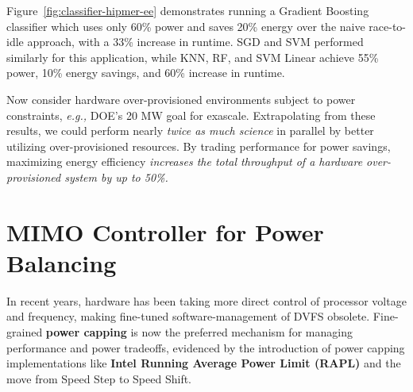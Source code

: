 \documentclass[a0,portrait]{a0poster}
\newcommand{\eg}{\textit{e.g., }}
\newcommand{\figref}[1]{Figure~\ref{fig:#1}}
\newcommand{\interface}[1]{\textbf{#1}}
\newcommand{\PAD}{\vskip 0.75cm}
\begin{document}
\begin{multicols}{2}
{
\PAD
\centering
  
  \label{fig:classifier-hipmer-ee}
\PAD
}

\figref{classifier-hipmer-ee} demonstrates running a Gradient Boosting classifier which uses only 60\% power and saves 20\% energy over the naive race-to-idle approach, with a 33\% increase in runtime.
SGD and SVM performed similarly for this application, while KNN, RF, and SVM Linear achieve 55\% power, 10\% energy savings, and 60\% increase in runtime.

Now consider hardware over-provisioned environments subject to power constraints, \eg DOE's 20 MW goal for exascale.
Extrapolating from these results, we could perform nearly \emph{twice as much science} in parallel by better utilizing over-provisioned resources.
By trading performance for power savings, maximizing energy efficiency \emph{increases the total throughput of a hardware over-provisioned system by up to 50\%.}








\vspace{-1cm}
\section*{MIMO Controller for Power Balancing}

In recent years, hardware has been taking more direct control of processor voltage and frequency, making fine-tuned software-management of DVFS obsolete.
Fine-grained \interface{power capping} is now the preferred mechanism for managing performance and power tradeoffs, evidenced by the introduction of power capping implementations like \interface{Intel Running Average Power Limit (RAPL)} and the move from Speed Step to Speed Shift.


\end{multicols}
\end{document}
